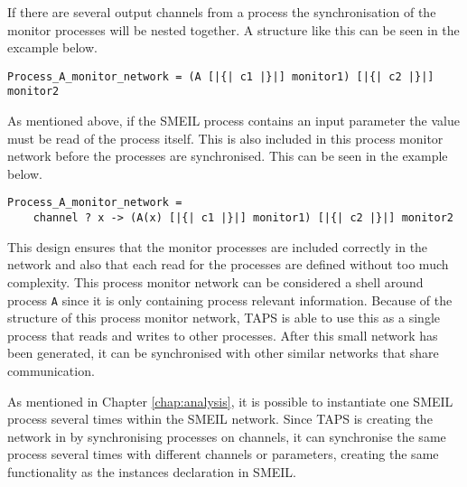 If there are several output channels from a process the synchronisation of the monitor processes will be nested together. A structure like this can be seen in the excample below.
\begin{verbatim}
Process_A_monitor_network = (A [|{| c1 |}|] monitor1) [|{| c2 |}|] monitor2
\end{verbatim}
As mentioned above, if the SMEIL process contains an input parameter the value must be read of the process itself. This is also included in this process monitor network before the processes are synchronised. This can be seen in the example below.
\begin{verbatim}
Process_A_monitor_network =
    channel ? x -> (A(x) [|{| c1 |}|] monitor1) [|{| c2 |}|] monitor2
\end{verbatim}
This design ensures that the monitor processes are included correctly in the network and also that each read for the processes are defined without too much complexity. This process monitor network can be considered a shell around process \texttt{A} since it is only containing process relevant information. Because of the structure of this process monitor network, TAPS is able to use this as a single process that reads and writes to other processes. After this small network has been generated, it can be synchronised with other similar networks that share communication.

As mentioned in Chapter \ref{chap:analysis}, it is possible to instantiate one SMEIL process several times within the SMEIL network. Since TAPS is creating the network in \cspm{} by synchronising processes on channels, it can synchronise the same process several times with different channels or parameters, creating the same functionality as the instances declaration in SMEIL.\\

